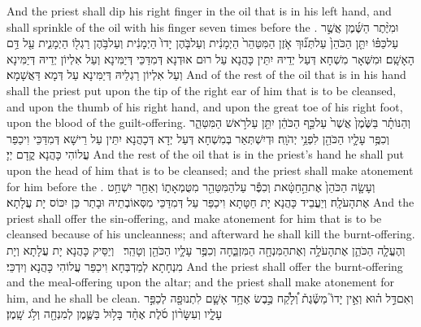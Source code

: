 {And the priest shall dip his right finger in the oil that is in his left hand, and shall sprinkle of the oil with his finger seven times before the \lord.}{}
{וּמִיֶּ֨תֶר הַשֶּׁ֜מֶן אֲשֶׁ֣ר עַל\maqqaf כַּפּ֗וֹ יִתֵּ֤ן הַכֹּהֵן֙ עַל\maqqaf תְּנ֞וּךְ אֹ֤זֶן הַמִּטַּהֵר֙ הַיְמָנִ֔ית וְעַל\maqqaf בֹּ֤הֶן יָדוֹ֙ הַיְמָנִ֔ית וְעַל\maqqaf בֹּ֥הֶן רַגְל֖וֹ הַיְמָנִ֑ית עַ֖ל דַּ֥ם הָאָשָֽׁם׃}
{וּמִשְּׁאָר מִשְׁחָא דְּעַל יְדֵיהּ יִתֵּין כָּהֲנָא עַל רוּם אוּדְנָא דְּמִדַּכֵּי דְּיַמִּינָא וְעַל אִלְיוֹן יְדֵיהּ דְּיַמִּינָא וְעַל אִלְיוֹן רַגְלֵיהּ דְּיַמִּינָא עַל דְּמָא דַּאֲשָׁמָא׃}
{And of the rest of the oil that is in his hand shall the priest put upon the tip of the right ear of him that is to be cleansed, and upon the thumb of his right hand, and upon the great toe of his right foot, upon the blood of the guilt-offering.}{}
{וְהַנּוֹתָ֗ר בַּשֶּׁ֙מֶן֙ אֲשֶׁר֙ עַל\maqqaf כַּ֣ף הַכֹּהֵ֔ן יִתֵּ֖ן עַל\maqqaf רֹ֣אשׁ הַמִּטַּהֵ֑ר וְכִפֶּ֥ר עָלָ֛יו הַכֹּהֵ֖ן לִפְנֵ֥י יְהֹוָֽה׃}
{וּדְיִשְׁתְּאַר בְּמִשְׁחָא דְּעַל יְדָא דְּכָהֲנָא יִתֵּין עַל רֵישָׁא דְּמִדַּכֵּי וִיכַפַּר עֲלוֹהִי כָּהֲנָא קֳדָם יְיָ׃}
{And the rest of the oil that is in the priest’s hand he shall put upon the head of him that is to be cleansed; and the priest shall make atonement for him before the \lord.}{}
{וְעָשָׂ֤ה הַכֹּהֵן֙ אֶת\maqqaf הַ֣חַטָּ֔את וְכִפֶּ֕ר עַל\maqqaf הַמִּטַּהֵ֖ר מִטֻּמְאָת֑וֹ וְאַחַ֖ר יִשְׁחַ֥ט אֶת\maqqaf הָעֹלָֽה׃}
{וְיַעֲבֵיד כָּהֲנָא יָת חַטָּתָא וִיכַפַּר עַל דְּמִדַּכֵּי מִסְּאוֹבְתֵיהּ וּבָתַר כֵּן יִכּוֹס יָת עֲלָתָא׃}
{And the priest shall offer the sin-offering, and make atonement for him that is to be cleansed because of his uncleanness; and afterward he shall kill the burnt-offering.}{}
{וְהֶעֱלָ֧ה הַכֹּהֵ֛ן אֶת\maqqaf הָעֹלָ֥ה וְאֶת\maqqaf הַמִּנְחָ֖ה הַמִּזְבֵּ֑חָה וְכִפֶּ֥ר עָלָ֛יו הַכֹּהֵ֖ן וְטָהֵֽר׃ \setuma }
{וְיַסֵּיק כָּהֲנָא יָת עֲלָתָא וְיָת מִנְחָתָא לְמַדְבְּחָא וִיכַפַּר עֲלוֹהִי כָּהֲנָא וְיִדְכֵּי׃}
{And the priest shall offer the burnt-offering and the meal-offering upon the altar; and the priest shall make atonement for him, and he shall be clean.}{}
{וְאִם\maqqaf דַּ֣ל ה֗וּא וְאֵ֣ין יָדוֹ֮ מַשֶּׂ֒גֶת֒ וְ֠לָקַ֠ח כֶּ֣בֶשׂ אֶחָ֥ד אָשָׁ֛ם לִתְנוּפָ֖ה לְכַפֵּ֣ר עָלָ֑יו וְעִשָּׂר֨וֹן סֹ֜לֶת אֶחָ֨ד בָּל֥וּל בַּשֶּׁ֛מֶן לְמִנְחָ֖ה וְלֹ֥ג שָֽׁמֶן׃}
